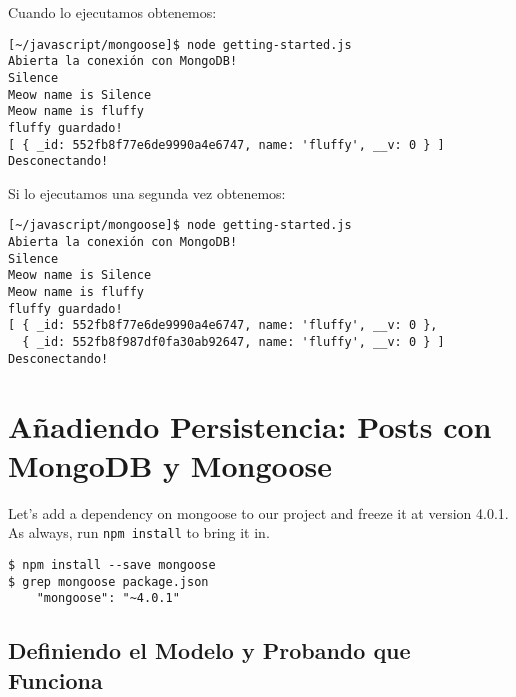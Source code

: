 Cuando lo ejecutamos obtenemos:
\begin{verbatim}
[~/javascript/mongoose]$ node getting-started.js 
Abierta la conexión con MongoDB!
Silence
Meow name is Silence
Meow name is fluffy
fluffy guardado!
[ { _id: 552fb8f77e6de9990a4e6747, name: 'fluffy', __v: 0 } ]
Desconectando!
\end{verbatim}
Si lo ejecutamos una segunda vez obtenemos:
\begin{verbatim}
[~/javascript/mongoose]$ node getting-started.js 
Abierta la conexión con MongoDB!
Silence
Meow name is Silence
Meow name is fluffy
fluffy guardado!
[ { _id: 552fb8f77e6de9990a4e6747, name: 'fluffy', __v: 0 },
  { _id: 552fb8f987df0fa30ab92647, name: 'fluffy', __v: 0 } ]
Desconectando!
\end{verbatim}

\section{Añadiendo Persistencia: Posts con MongoDB y Mongoose}
Let’s add a dependency on mongoose to our project and freeze it at version 4.0.1.
As always, run \verb|npm install| to bring it in. 
\begin{verbatim}
$ npm install --save mongoose
$ grep mongoose package.json 
    "mongoose": "~4.0.1"
\end{verbatim}

\subsection{Definiendo el Modelo y Probando que Funciona}

